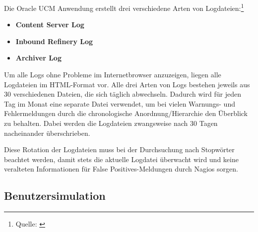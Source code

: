 Die Oracle UCM Anwendung erstellt drei verschiedene Arten von Logdateien:\footnote{Quelle: \cite{UCMlog09}}

\begin{itemize}
\item \textbf{Content Server Log} 
\item \textbf{Inbound Refinery Log}
\item \textbf{Archiver Log}
\end{itemize}

Um alle Logs ohne Probleme im Internetbrowser anzuzeigen, liegen alle Logdateien im HTML-Format vor.
Alle drei Arten von Logs bestehen jeweils aus 30 verschiedenen Dateien, die sich täglich abwechseln.
Dadurch wird für jeden Tag im Monat eine separate Datei verwendet, um bei vielen Warnungs- und Fehlermeldungen durch die chronologische Anordnung/Hierarchie den Überblick zu behalten.
Dabei werden die Logdateien zwangsweise nach 30 Tagen nacheinander überschrieben.

Diese Rotation der Logdateien muss bei der Durchsuchung nach Stopwörter beachtet werden, damit stets die aktuelle Logdatei überwacht wird und keine veralteten Informationen für False Positives-Meldungen durch Nagios sorgen.


\subsection{Benutzersimulation}

